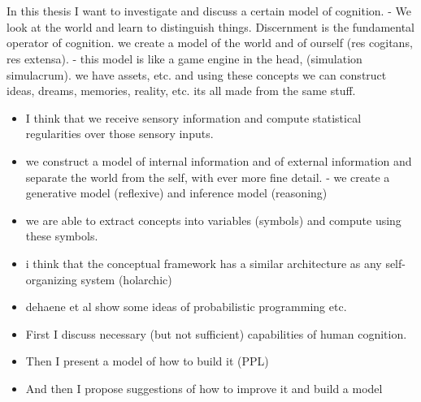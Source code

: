 \section{}

In this thesis I want to investigate and discuss a certain model of cognition.
- We look at the world and learn to distinguish things. Discernment is the fundamental operator of cognition.
we create a model of the world and of ourself (res cogitans, res extensa).
- this model is like a game engine in the head, (simulation simulacrum). we have assets, etc. and using these concepts we can construct ideas, dreams, memories, reality, etc. its all made from the same stuff.






\begin{itemize}
    \item I think that we receive sensory information and compute statistical regularities over those sensory inputs. 
    \item we construct a model of internal information and of external information and separate the world from the self, with ever more fine detail. - we create a generative model (reflexive) and inference model (reasoning)
    \item we are able to extract concepts into variables (symbols) and compute using these symbols.
    \item i think that the conceptual framework has a similar architecture as any self-organizing system (holarchic)
    \item dehaene et al show some ideas of probabilistic programming etc. 
\end{itemize}



\begin{itemize}
    \item First I discuss necessary (but not sufficient) capabilities of human cognition. 
    \item Then I present a model of how to build it (PPL)
    \item And then I propose suggestions of how to improve it and build a model 
\end{itemize}




